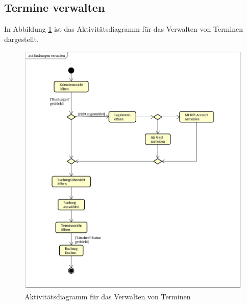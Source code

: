 \subsection{Termine verwalten}
In Abbildung \ref{fig:activity_diagram_booking_manage} ist das Aktivitätsdiagramm für das Verwalten von Terminen dargestellt.
\begin{figure}[ht]
    \centering
    \includegraphics[scale=0.25]{figures/activitydiagrams/buchungverwalten}
    \caption{Aktivitätsdiagramm für das Verwalten von Terminen}
    \label{fig:activity_diagram_booking_manage}
\end{figure}

\clearpage
